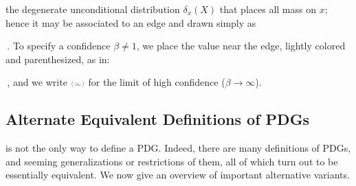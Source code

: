 the degenerate unconditional distribution $\delta_x(X)$ that places all mass on $x$;
hence it may be associated to an edge and drawn simply as
\,.
To specify a confidence $\beta \ne 1$,
we place the value near the edge, lightly colored and parenthesized, as in:
\!\!\!\!
\,,
and we write ${\scriptstyle\color{gray}(\infty)}$ for the limit of high confidence ($\beta\!\to\! \infty$). %





\subsection{Alternate Equivalent Definitions of PDGs}
    \label{sec:alt-pdgs}

 is not the only way to define a PDG. 
Indeed, there are many definitions of PDGs, and seeming generalizations
or restrictions of them, all of which turn out to be essentially equivalent. 
We now give an overview of important alternative variants.

